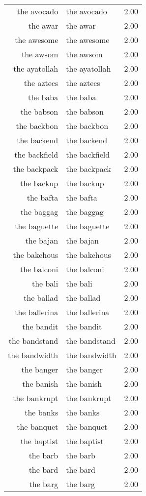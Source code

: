 \begin{table}[ht]
\begin{tabular}{rlr}
  the avocado & the avocado & 2.00 \\ 
  the awar & the awar & 2.00 \\ 
  the awesome & the awesome & 2.00 \\ 
  the awsom & the awsom & 2.00 \\ 
  the ayatollah & the ayatollah & 2.00 \\ 
  the aztecs & the aztecs & 2.00 \\ 
  the baba & the baba & 2.00 \\ 
  the babson & the babson & 2.00 \\ 
  the backbon & the backbon & 2.00 \\ 
  the backend & the backend & 2.00 \\ 
  the backfield & the backfield & 2.00 \\ 
  the backpack & the backpack & 2.00 \\ 
  the backup & the backup & 2.00 \\ 
  the bafta & the bafta & 2.00 \\ 
  the baggag & the baggag & 2.00 \\ 
  the baguette & the baguette & 2.00 \\ 
  the bajan & the bajan & 2.00 \\ 
  the bakehous & the bakehous & 2.00 \\ 
  the balconi & the balconi & 2.00 \\ 
  the bali & the bali & 2.00 \\ 
  the ballad & the ballad & 2.00 \\ 
  the ballerina & the ballerina & 2.00 \\ 
  the bandit & the bandit & 2.00 \\ 
  the bandstand & the bandstand & 2.00 \\ 
  the bandwidth & the bandwidth & 2.00 \\ 
  the banger & the banger & 2.00 \\ 
  the banish & the banish & 2.00 \\ 
  the bankrupt & the bankrupt & 2.00 \\ 
  the banks & the banks & 2.00 \\ 
  the banquet & the banquet & 2.00 \\ 
  the baptist & the baptist & 2.00 \\ 
  the barb & the barb & 2.00 \\ 
  the bard & the bard & 2.00 \\ 
  the barg & the barg & 2.00 \\ 

\end{tabular}
\end{table}
